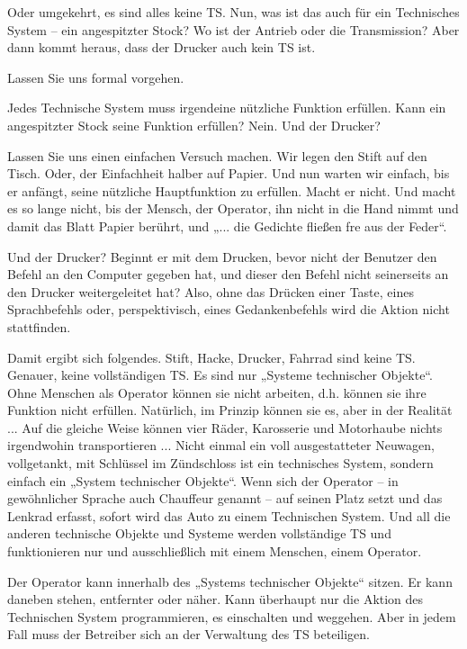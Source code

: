 \documentclass[11pt,a4paper]{article}
\begin{document}
Oder umgekehrt, es sind alles keine TS. Nun, was ist das auch für ein
Technisches System -- ein angespitzter Stock? Wo ist der Antrieb oder die
Transmission?  Aber dann kommt heraus, dass der Drucker auch kein TS ist.

Lassen Sie uns formal vorgehen. 

Jedes Technische System muss irgendeine nützliche Funktion erfüllen.
Kann ein angespitzter Stock seine Funktion erfüllen? Nein. Und der Drucker?

Lassen Sie uns einen einfachen Versuch machen. Wir legen den Stift auf den
Tisch. Oder, der Einfachheit halber auf Papier.  Und nun warten wir einfach,
bis er anfängt, seine nützliche Hauptfunktion zu erfüllen.  Macht er nicht.
Und macht es so lange nicht, bis der Mensch, der Operator, ihn nicht in die
Hand nimmt und damit das Blatt Papier berührt, und „... die Gedichte fließen
fre aus der Feder“.

Und der Drucker? Beginnt er mit dem Drucken, bevor nicht der Benutzer den
Befehl an den Computer gegeben hat, und dieser den Befehl nicht seinerseits an
den Drucker weitergeleitet hat? Also, ohne das Drücken einer Taste, eines
Sprachbefehls oder, perspektivisch, eines Gedankenbefehls wird die Aktion
nicht stattfinden.

Damit ergibt sich folgendes. Stift, Hacke, Drucker, Fahrrad sind keine TS.
Genauer, keine vollständigen TS. Es sind nur „Systeme technischer Objekte“.
Ohne Menschen als Operator können sie nicht arbeiten, d.h. können sie ihre
Funktion nicht erfüllen. Natürlich, im Prinzip können sie es, aber in der
Realität ... Auf die gleiche Weise können vier Räder, Karosserie und
Motorhaube nichts irgendwohin transportieren ... Nicht einmal ein voll
ausgestatteter Neuwagen, vollgetankt, mit Schlüssel im Zündschloss ist ein
technisches System, sondern einfach ein „System technischer Objekte“.  Wenn
sich der Operator -- in gewöhnlicher Sprache auch Chauffeur genannt -- auf
seinen Platz setzt und das Lenkrad erfasst, sofort wird das Auto zu einem
Technischen System. Und all die anderen technische Objekte und Systeme werden
vollständige TS und funktionieren nur und ausschließlich mit einem Menschen,
einem Operator.

Der Operator kann innerhalb des „Systems technischer Objekte“ sitzen. Er kann
daneben stehen, entfernter oder näher. Kann überhaupt nur die Aktion des
Technischen System programmieren, es einschalten und weggehen. Aber in jedem
Fall muss der Betreiber sich an der Verwaltung des TS beteiligen.
\end{document}
